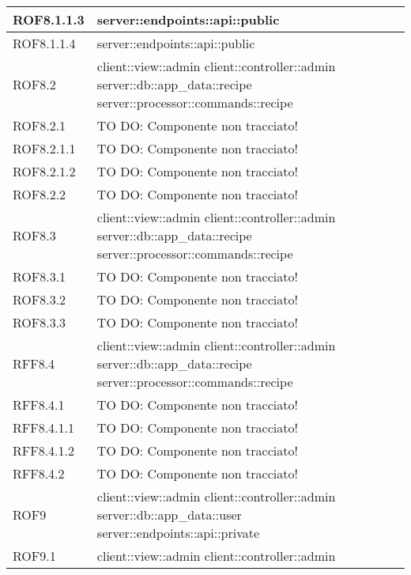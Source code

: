 \begin{center}
\begin{longtable}{| p{4cm} | p{8cm} |}
\hline
ROF8.1.1.3 & server::endpoints::api::public \\
\hline
ROF8.1.1.4 & server::endpoints::api::public \\
\hline
ROF8.2 & client::view::admin \newline client::controller::admin \newline server::db::app\_data::recipe \newline server::processor::commands::recipe \\
\hline
ROF8.2.1 & TO DO: Componente non tracciato! \\
\hline
ROF8.2.1.1 & TO DO: Componente non tracciato! \\
\hline
ROF8.2.1.2 & TO DO: Componente non tracciato! \\
\hline
ROF8.2.2 & TO DO: Componente non tracciato! \\
\hline
ROF8.3 & client::view::admin \newline client::controller::admin \newline server::db::app\_data::recipe \newline server::processor::commands::recipe \\
\hline
ROF8.3.1 & TO DO: Componente non tracciato! \\
\hline
ROF8.3.2 & TO DO: Componente non tracciato! \\
\hline
ROF8.3.3 & TO DO: Componente non tracciato! \\
\hline
RFF8.4 & client::view::admin \newline client::controller::admin \newline server::db::app\_data::recipe \newline server::processor::commands::recipe \\
\hline
RFF8.4.1 & TO DO: Componente non tracciato! \\
\hline
RFF8.4.1.1 & TO DO: Componente non tracciato! \\
\hline
RFF8.4.1.2 & TO DO: Componente non tracciato! \\
\hline
RFF8.4.2 & TO DO: Componente non tracciato! \\
\hline
ROF9 & client::view::admin \newline client::controller::admin \newline server::db::app\_data::user \newline server::endpoints::api::private \\
\hline
ROF9.1 & client::view::admin \newline client::controller::admin \\

\end{longtable}
\end{center}
